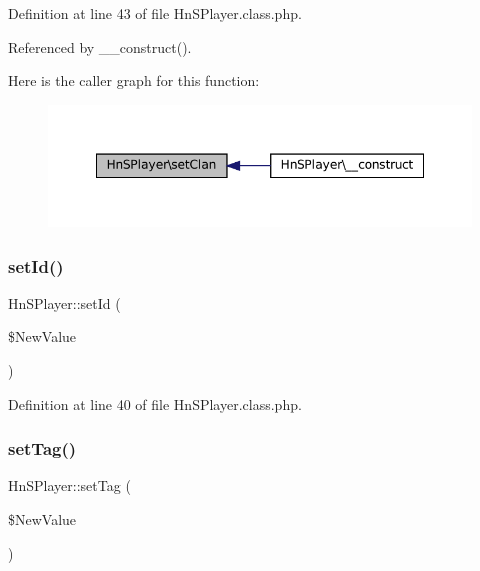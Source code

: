 Definition at line 43 of file Hn\+S\+Player.\+class.\+php.



Referenced by \+\_\+\+\_\+construct().

Here is the caller graph for this function\+:\nopagebreak
\begin{figure}[H]
\begin{center}
\leavevmode
\includegraphics[width=348pt]{class_hn_s_player_ab3a0cb11bac6bef00d1aff09e1d9ab9e_icgraph}
\end{center}
\end{figure}
\mbox{\label{class_hn_s_player_ae2b290bd8ed63b2045418386d616eb26}} 
\subsubsection{\texorpdfstring{set\+Id()}{setId()}}
{\footnotesize\ttfamily Hn\+S\+Player\+::set\+Id (\begin{DoxyParamCaption}\item[{}]{\$\+New\+Value }\end{DoxyParamCaption})}



Definition at line 40 of file Hn\+S\+Player.\+class.\+php.

\mbox{\label{class_hn_s_player_ae89a8821f5115eedc4b3d576c797d78e}} 
\subsubsection{\texorpdfstring{set\+Tag()}{setTag()}}
{\footnotesize\ttfamily Hn\+S\+Player\+::set\+Tag (\begin{DoxyParamCaption}\item[{}]{\$\+New\+Value }\end{DoxyParamCaption})}




